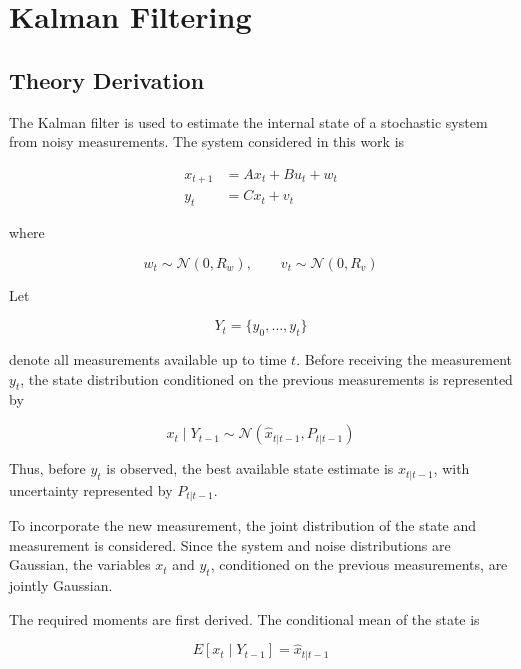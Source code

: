 \chapter{Kalman Filtering}

\section{Theory Derivation}
\label{sec:kalman_theory}

The Kalman filter is used to estimate the internal state of a stochastic
system from noisy measurements. The system considered in this work is

\begin{align}
    x_{t+1} &= Ax_t + Bu_t + w_t \\
    y_t &= Cx_t + v_t
\end{align}

where

\begin{equation}
    w_t \sim \mathcal{N}(0,R_w),
    \qquad
    v_t \sim \mathcal{N}(0,R_v)
\end{equation}

Let

\begin{equation}
    Y_t = \{y_0,\ldots,y_t\}
\end{equation}

denote all measurements available up to time \(t\). Before receiving the
measurement \(y_t\), the state distribution conditioned on the previous
measurements is represented by

\begin{equation}
    x_t \mid Y_{t-1}
    \sim
    \mathcal{N}
    \left(
        \hat{x}_{t|t-1},
        P_{t|t-1}
    \right)
\end{equation}

Thus, before \(y_t\) is observed, the best available state estimate is
\(\hat{x}_{t|t-1}\), with uncertainty represented by \(P_{t|t-1}\).

To incorporate the new measurement, the joint distribution of the state and
measurement is considered. Since the system and noise distributions are
Gaussian, the variables \(x_t\) and \(y_t\), conditioned on the previous
measurements, are jointly Gaussian.

The required moments are first derived. The conditional mean of the state is

\begin{equation}
    E[x_t \mid Y_{t-1}]
    =
    \hat{x}_{t|t-1}
\end{equation}

